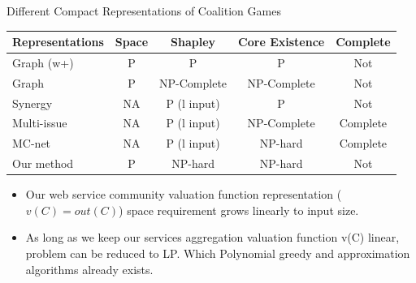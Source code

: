 \documentclass{beamer}
\begin{document}
\begin{frame}{Different Compact Representations of Coalition Games}

    \begin{table}
        \small
        \begin{tabular}{l|c|c|c|c}
        Representations                  & Space    & Shapley                  & Core Existence  & Complete     \\ \hline
        Graph (w+)                       & P        & P                        & P               & Not          \\
        Graph                            & P        & NP-Complete              & NP-Complete     & Not          \\
        Synergy                          & NA       & P (l input)              & P               & Not          \\
        Multi-issue                      & NA       & P (l input)              & NP-Complete     & Complete     \\
        MC-net                           & NA       & P (l input)              & NP-hard         & Complete     \\
        Our method                       & P        & NP-hard                  & NP-hard         & Not          \\
        \end{tabular}
    \end{table}

    \begin{itemize}
        \item Our web service community valuation function representation ($v(C) = out(C)$) space requirement grows linearly to input size.
        \item As long as we keep our services aggregation valuation function v(C) linear, problem can be reduced to LP. Which Polynomial greedy and approximation algorithms already exists.
    \end{itemize}

\end{frame}


\end{document}
